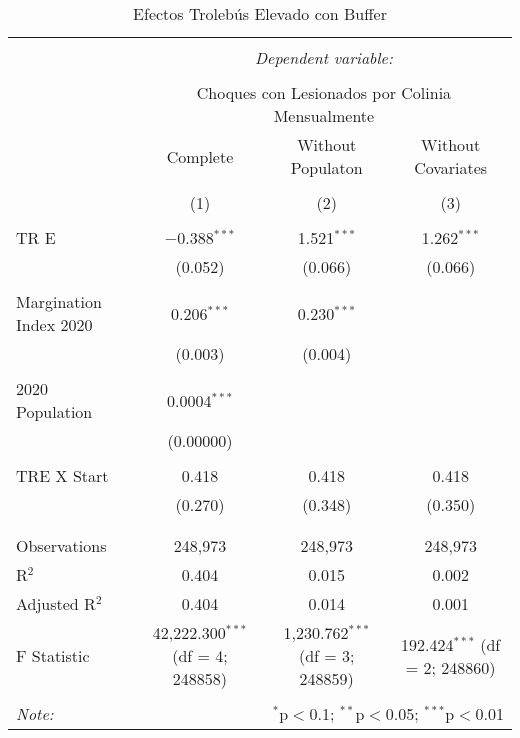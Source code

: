 
\begin{table}[!htbp] \centering 
  \caption{Efectos Trolebús Elevado con Buffer} 
  \label{} 
\begin{tabular}{@{\extracolsep{5pt}}lccc} 
\\[-1.8ex]\hline 
\hline \\[-1.8ex] 
 & \multicolumn{3}{c}{\textit{Dependent variable:}} \\ 
\cline{2-4} 
\\[-1.8ex] & \multicolumn{3}{c}{Choques con Lesionados por Colinia Mensualmente} \\ 
 & Complete & Without Populaton & Without Covariates \\ 
\\[-1.8ex] & (1) & (2) & (3)\\ 
\hline \\[-1.8ex] 
 TR E & $-$0.388$^{***}$ & 1.521$^{***}$ & 1.262$^{***}$ \\ 
  & (0.052) & (0.066) & (0.066) \\ 
  & & & \\ 
 Margination Index 2020 & 0.206$^{***}$ & 0.230$^{***}$ &  \\ 
  & (0.003) & (0.004) &  \\ 
  & & & \\ 
 2020 Population & 0.0004$^{***}$ &  &  \\ 
  & (0.00000) &  &  \\ 
  & & & \\ 
 TRE X Start & 0.418 & 0.418 & 0.418 \\ 
  & (0.270) & (0.348) & (0.350) \\ 
  & & & \\ 
\hline \\[-1.8ex] 
Observations & 248,973 & 248,973 & 248,973 \\ 
R$^{2}$ & 0.404 & 0.015 & 0.002 \\ 
Adjusted R$^{2}$ & 0.404 & 0.014 & 0.001 \\ 
F Statistic & 42,222.300$^{***}$ (df = 4; 248858) & 1,230.762$^{***}$ (df = 3; 248859) & 192.424$^{***}$ (df = 2; 248860) \\ 
\hline 
\hline \\[-1.8ex] 
\textit{Note:}  & \multicolumn{3}{r}{$^{*}$p$<$0.1; $^{**}$p$<$0.05; $^{***}$p$<$0.01} \\ 
\end{tabular} 
\end{table} 
